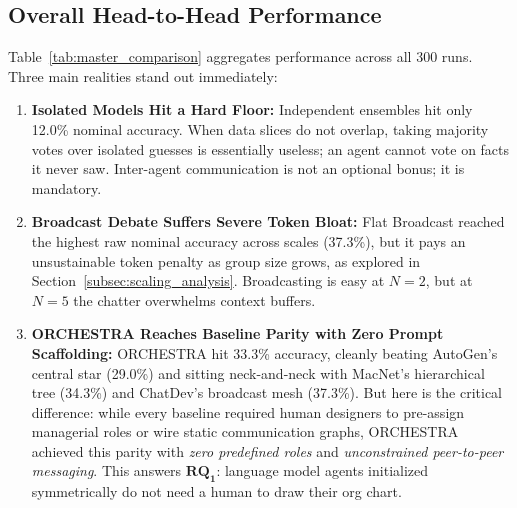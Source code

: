 \documentclass{ieeeaccess}
\begin{document}
\subsection{Overall Head-to-Head Performance}
Table~\ref{tab:master_comparison} aggregates performance across all 300 runs. Three main realities stand out immediately:
\begin{enumerate}
    \item \textbf{Isolated Models Hit a Hard Floor:} Independent ensembles hit only 12.0\% nominal accuracy. When data slices do not overlap, taking majority votes over isolated guesses is essentially useless; an agent cannot vote on facts it never saw. Inter-agent communication is not an optional bonus; it is mandatory.
    \item \textbf{Broadcast Debate Suffers Severe Token Bloat:} Flat Broadcast reached the highest raw nominal accuracy across scales (37.3\%), but it pays an unsustainable token penalty as group size grows, as explored in Section~\ref{subsec:scaling_analysis}. Broadcasting is easy at $N=2$, but at $N=5$ the chatter overwhelms context buffers.
    \item \textbf{ORCHESTRA Reaches Baseline Parity with Zero Prompt Scaffolding:} ORCHESTRA hit 33.3\% accuracy, cleanly beating AutoGen's central star (29.0\%) and sitting neck-and-neck with MacNet's hierarchical tree (34.3\%) and ChatDev's broadcast mesh (37.3\%). But here is the critical difference: while every baseline required human designers to pre-assign managerial roles or wire static communication graphs, ORCHESTRA achieved this parity with \textit{zero predefined roles} and \textit{unconstrained peer-to-peer messaging}. This answers $\mathbf{RQ_1}$: language model agents initialized symmetrically do not need a human to draw their org chart.
\end{enumerate}
\end{document}
